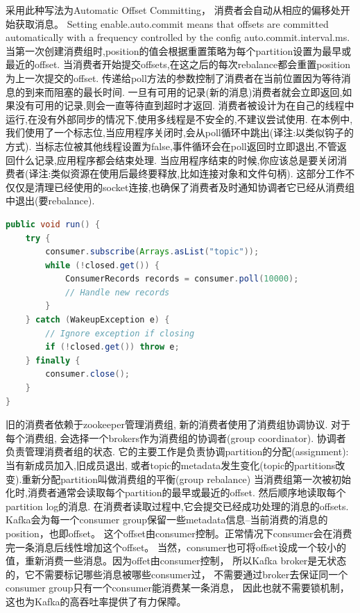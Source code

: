 \documentclass{book}
\begin{document}
采用此种写法为Automatic Offset Committing，
消费者会自动从相应的偏移处开始获取消息。
Setting enable.auto.commit means that offsets are committed automatically 
with a frequency controlled by the config auto.commit.interval.ms.
当第一次创建消费组时,position的值会根据重置策略为每个partition设置为最早或最近的offset.
当消费者开始提交offsets,在这之后的每次rebalance都会重置position为上一次提交的offset.
传递给poll方法的参数控制了消费者在当前位置因为等待消息的到来而阻塞的最长时间.
一旦有可用的记录(新的消息)消费者就会立即返回,如果没有可用的记录,则会一直等待直到超时才返回.
消费者被设计为在自己的线程中运行,在没有外部同步的情况下,使用多线程是不安全的,不建议尝试使用.
在本例中,我们使用了一个标志位,当应用程序关闭时,会从poll循环中跳出(译注:以类似钩子的方式).
当标志位被其他线程设置为false,事件循环会在poll返回时立即退出,不管返回什么记录,应用程序都会结束处理.
当应用程序结束的时候,你应该总是要关闭消费者(译注:类似资源在使用后最终要释放,比如连接对象和文件句柄).
这部分工作不仅仅是清理已经使用的socket连接,也确保了消费者及时通知协调者它已经从消费组中退出(要rebalance).

\begin{lstlisting}[language=Java]
public void run() {
	try {
		consumer.subscribe(Arrays.asList("topic"));
		while (!closed.get()) {
			ConsumerRecords records = consumer.poll(10000);
			// Handle new records
		}
	} catch (WakeupException e) {
		// Ignore exception if closing
		if (!closed.get()) throw e;
	} finally {
		consumer.close();
	}
}
\end{lstlisting}

旧的消费者依赖于zookeeper管理消费组,
新的消费者使用了消费组协调协议. 对于每个消费组,
会选择一个brokers作为消费组的协调者(group coordinator).
协调者负责管理消费者组的状态. 它的主要工作是负责协调partition的分配(assignment): 
当有新成员加入,旧成员退出,
或者topic的metadata发生变化(topic的partitions改变).重新分配partition叫做消费组的平衡(group rebalance)
当消费组第一次被初始化时,消费者通常会读取每个partition的最早或最近的offset.
然后顺序地读取每个partition log的消息.
在消费者读取过程中,它会提交已经成功处理的消息的offsets. 
Kafka会为每一个consumer group保留一些metadata信息–当前消费的消息的position，也即offset。
这个offset由consumer控制。正常情况下consumer会在消费完一条消息后线性增加这个offset。
当然，consumer也可将offset设成一个较小的值，重新消费一些消息。因为offet由consumer控制，
所以Kafka broker是无状态的，它不需要标记哪些消息被哪些consumer过，
不需要通过broker去保证同一个consumer group只有一个consumer能消费某一条消息，
因此也就不需要锁机制，这也为Kafka的高吞吐率提供了有力保障。 
\end{document}
